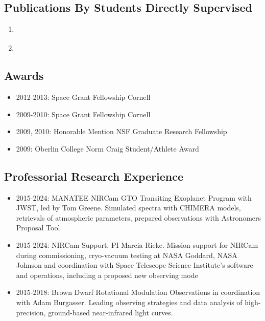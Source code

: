 \documentclass[11pt, oneside]{article}   	%
\begin{document}
\subsection*{Publications By Students Directly Supervised}

\begin{enumerate}[noitemsep]
\item \citet{baka2021peeringThroughDebris}
\item \citet{glidic2022corot1}
\end{enumerate}


%
%

\vspace{-0.15in}
\subsection*{Awards}
\begin{itemize}[noitemsep]
        \item 2012-2013: Space Grant Fellowship Cornell
        \item 2009-2010: Space Grant Fellowship Cornell
        \item 2009, 2010: Honorable Mention NSF Graduate Research Fellowship 
        \item 2009: Oberlin College Norm Craig Student/Athlete Award
\end{itemize}

\subsection*{Professorial Research Experience}
\begin{itemize}[noitemsep]
	\item 2015-2024: MANATEE NIRCam GTO Transiting Exoplanet Program with JWST, led by Tom Greene. Simulated spectra with CHIMERA models, retrievals of atmospheric parameters, prepared observations with Astronomers Proposal Tool
	\item 2015-2024: NIRCam Support, PI Marcia Rieke. Mission support for NIRCam during commissioning, cryo-vacuum testing at NASA Goddard, NASA Johnson and coordination with Space Telescope Science Institute's software and operations, including a proposed new observing mode
	\item 2015-2018: Brown Dwarf Rotational Modulation Observations in coordination with Adam Burgasser. Leading observing strategies and data analysis of high-precision, ground-based near-infrared light curves.
\end{itemize}
\end{document}
